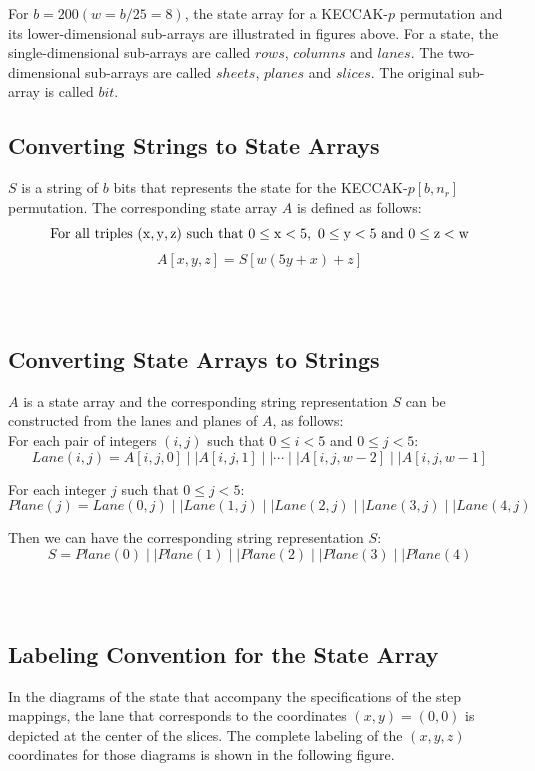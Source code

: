 \documentclass[12pt,a4paper,oneside]{report}
\newcommand{\inputmintedindent}[2]{
    \begin{minipage}{0.1\linewidth}\end{minipage}
    \begin{minipage}{0.85\linewidth}
        \inputminted[linenos,breaklines,fontsize=\footnotesize]{#1}{#2}
    \end{minipage}\\[0.5em]
}
\begin{document}
For $b=200 (w=b/25=8)$, the state array for a KECCAK-$p$ permutation and its lower-dimensional sub-arrays are illustrated in figures above. For a state, the single-dimensional sub-arrays are called $rows$, $columns$ and $lanes$. The two-dimensional sub-arrays are called $sheets$, $planes$ and $slices$. The original sub-array is called $bit$.

\subsection{Converting Strings to State Arrays}
$S$ is a string of $b$ bits that represents the state for the KECCAK-$p[b, n_r]$ permutation. The corresponding state array $A$ is defined as follows:\\
$$\rm{For\ all\ triples\ (x,y,z)\ such\ that\ 0 \leq x < 5,\ 0 \leq y < 5\ and\ 0 \leq z < w}$$
$$A[x,y,z]=S[w(5y+x)+z]$$

\inputmintedindent{C}{code_split/sha3_convert_string_to_state_array.c}

\subsection{Converting State Arrays to Strings}
$A$ is a state array and the corresponding string representation $S$ can be constructed from the lanes and planes of $A$, as follows:\\

For each pair of integers $(i,j)$ such that $0 \leq i < 5$ and $0 \leq j < 5$:
$$Lane(i,j)=A[i,j,0] \mid\mid A[i,j,1] \mid\mid \cdots \mid\mid A[i,j,w-2] \mid\mid A[i,j,w-1]$$

For each integer $j$ such that $0 \leq j < 5$:
$$Plane(j)=Lane(0,j) \mid\mid Lane(1,j) \mid\mid Lane(2,j) \mid\mid Lane(3,j) \mid\mid Lane(4,j)$$

Then we can have the corresponding string representation $S$: 
$$S=Plane(0) \mid\mid Plane(1) \mid\mid Plane(2) \mid\mid Plane(3) \mid\mid Plane(4)$$

\inputmintedindent{C}{code_split/sha3_convert_state_array_to_string.c}


\newpage
\subsection{Labeling Convention for the State Array}
In the diagrams of the state that accompany the specifications of the step mappings, the lane that corresponds to the coordinates $(x,y)=(0,0)$ is depicted at the center of the slices. The complete labeling of the $(x,y,z)$ coordinates for those diagrams is shown in the following figure.
\end{document}
